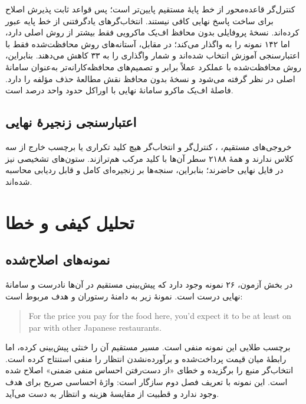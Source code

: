 کنترل‌گر قاعده‌محور از خط پایۀ مستقیم پایین‌تر است؛ پس قواعد ثابت پذیرش اصلاح برای ساخت پاسخ نهایی کافی نیستند. انتخاب‌گرهای یادگرفتنی از خط پایه عبور کرده‌اند. نسخۀ پروفایلی بدون محافظ اف‌یک ماکرویی فقط  بیشتر از روش اصلی دارد، اما ۱۴۲ نمونه را به  واگذار می‌کند؛ در مقابل، آستانه‌های روش محافظت‌شده فقط با اعتبارسنجی آموزش انتخاب شده‌اند و شمار واگذاری را به ۳۳ کاهش می‌دهند. بنابراین، روش محافظت‌شده با عملکرد عملاً برابر و تصمیم‌های محافظه‌کارانه‌تر به‌عنوان سامانۀ اصلی در نظر گرفته می‌شود و نسخۀ بدون محافظ نقش مطالعۀ حذف مؤلفه را دارد. فاصلۀ اف‌یک ماکرو سامانۀ نهایی با اوراکل حدود  واحد درصد است.

\subsection{اعتبارسنجی زنجیرۀ نهایی}

خروجی‌های مستقیم، ، کنترل‌گر و انتخاب‌گر هیچ کلید تکراری یا برچسب خارج از سه کلاس ندارند و همۀ ۲۱۸۸ سطر آن‌ها با کلید مرکب هم‌ترازند. ستون‌های تشخیصی نیز در فایل نهایی حاضرند؛ بنابراین، سنجه‌ها بر زنجیره‌ای کامل و قابل ردیابی محاسبه شده‌اند.

\section{تحلیل کیفی و خطا}

\subsection{نمونه‌های اصلاح‌شده}

در بخش آزمون، ۲۶ نمونه وجود دارد که پیش‌بینی مستقیم در آن‌ها نادرست و سامانۀ نهایی درست است. نمونۀ زیر به دامنۀ رستوران و هدف  مربوط است:

\begin{latin}
\begin{quote}
For the price you pay for the food here, you'd expect it to be at least on par with other Japanese restaurants.
\end{quote}
\end{latin}

برچسب طلایی این نمونه منفی است. مسیر مستقیم آن را خنثی پیش‌بینی کرده، اما  رابطۀ میان قیمت پرداخت‌شده و برآورده‌نشدن انتظار را منفی استنتاج کرده است. انتخاب‌گر منبع  را برگزیده و خطای «از دست‌رفتن احساس منفی ضمنی» اصلاح شده است. این نمونه با تعریف فصل دوم سازگار است: واژۀ احساسی صریح برای هدف وجود ندارد و قطبیت از مقایسۀ هزینه و انتظار به دست می‌آید.

